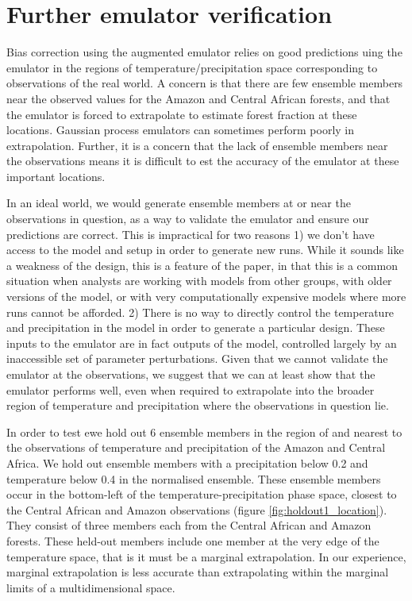\documentclass[gmd, manuscript]{copernicus} %
\begin{document}
\section{Further emulator verification}\label{sec:further_verification}

Bias correction using the augmented emulator relies on good predictions uing the emulator in the regions of temperature/precipitation space corresponding to observations of the real world. A concern is that there are few ensemble members near the observed values for the Amazon and Central African forests, and that the emulator is forced to extrapolate to estimate forest fraction at these locations. Gaussian process emulators can sometimes perform poorly in extrapolation. Further, it is a concern that the lack of ensemble members near the observations means it is difficult to est the accuracy of the emulator at these important locations.

In an ideal world, we would generate ensemble members at or near the observations in question, as a way to validate the emulator and ensure our predictions are correct. This is impractical for two reasons 1) we don’t have access to the model and setup in order to generate new runs. While it sounds like a weakness of the design, this is a feature of the paper, in that this is a common situation when analysts are working with models from other groups, with older versions of the model, or with very computationally expensive models where more runs cannot be afforded. 2) There is no way to directly control the temperature and precipitation in the model in order to generate a particular design. These inputs to the emulator are in fact outputs of the model, controlled largely by an inaccessible set of parameter perturbations. Given that we cannot validate the emulator at the observations, we suggest that we can at least show that the emulator performs well, even when required to extrapolate into the broader region of temperature and precipitation where the observations in question lie.

In order to test ewe hold out 6 ensemble members in the region of and nearest to the observations  of temperature and precipitation of the Amazon and Central Africa. We hold out ensemble members with a precipitation below 0.2 and temperature below 0.4 in the normalised ensemble. These ensemble members occur in the bottom-left of the temperature-precipitation phase space, closest to the Central African and Amazon observations (figure \ref{fig:holdout1_location}). They consist of three members each from the Central African and Amazon forests. These held-out members include one member at the very edge of the temperature space, that is it must be a marginal extrapolation. In our experience, marginal extrapolation is less accurate than extrapolating within the marginal limits of a multidimensional space.
\end{document}
